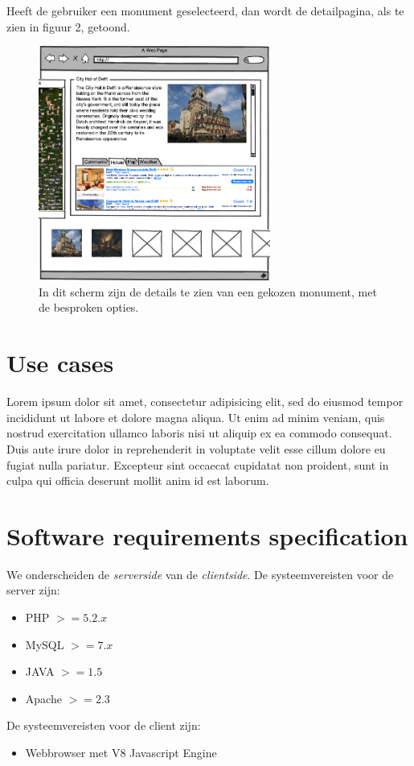 \documentclass{article}
\begin{document}
Heeft de gebruiker een monument geselecteerd, dan wordt de detailpagina, als te zien in figuur 2, getoond. 
\begin{figure}[htp]
  \centering
  \includegraphics[width=3in]{user-story-detail.png}
  \caption[Voorbeeld van een detailpagina van een monument]%
  {In dit scherm zijn de details te zien van een gekozen monument, met de besproken opties.}
\end{figure}

\section{Use cases}
Lorem ipsum dolor sit amet, consectetur adipisicing elit, sed do eiusmod tempor incididunt ut labore et dolore magna aliqua. Ut enim ad minim veniam, quis nostrud exercitation ullamco laboris nisi ut aliquip ex ea commodo consequat. Duis aute irure dolor in reprehenderit in voluptate velit esse cillum dolore eu fugiat nulla pariatur. Excepteur sint occaecat cupidatat non proident, sunt in culpa qui officia deserunt mollit anim id est laborum.
\section{Software requirements specification}
We onderscheiden de \emph{serverside} van de \emph{clientside}.
De systeemvereisten voor de server zijn:
\begin{itemize}
	\item{PHP $>= 5.2.x$}
	\item{MySQL $>= 7.x$}
	\item{JAVA $>= 1.5$}
	\item{Apache $>= 2.3$}
\end{itemize}
De systeemvereisten voor de client zijn:
\begin{itemize}
	\item{Webbrowser met V8 Javascript Engine}
\end{itemize}
\end{document}

